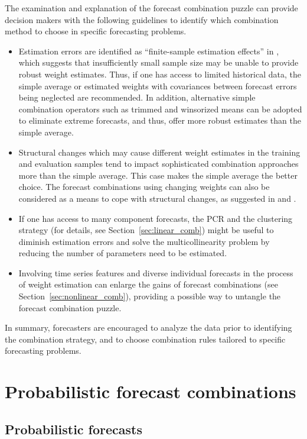 \documentclass[11pt]{article}
\begin{document}
The examination and explanation of the forecast combination puzzle can provide decision makers with the following guidelines to identify which combination method to choose in specific forecasting problems.
\begin{itemize}
  \item Estimation errors are identified as ``finite-sample estimation effects'' in \citet{Smith2009-wd}, which suggests that insufficiently small sample size may be unable to provide robust weight estimates. Thus, if one has access to limited historical data, the simple average or estimated weights with covariances between forecast errors being neglected are recommended. In addition, alternative simple combination operators such as trimmed and winsorized means can be adopted to eliminate extreme forecasts, and thus, offer more robust estimates than the simple average.
  \item Structural changes which may cause different weight estimates in the training and evaluation samples tend to impact sophisticated combination approaches more than the simple average. This case makes the simple average the better choice. The forecast combinations using changing weights can also be considered as a means to cope with structural changes, as suggested in \citet{Diebold1987-go} and \citet{Deutsch1994-ob}.
  \item If one has access to many component forecasts, the PCR and the clustering strategy (for details, see Section~\ref{sec:linear_comb}) might be useful to diminish estimation errors and solve the multicollinearity problem by reducing the number of parameters need to be estimated.
  \item Involving time series features and diverse individual forecasts in the process of weight estimation can enlarge the gains of forecast combinations (see Section~\ref{sec:nonlinear_comb}), providing a possible way to untangle the forecast combination puzzle.
\end{itemize}
In summary, forecasters are encouraged to analyze the data prior to identifying the combination strategy, and to choose combination rules tailored to specific forecasting problems.

\section{Probabilistic forecast combinations}
\label{sec:probabilistic}

\subsection{Probabilistic forecasts}
\end{document}
